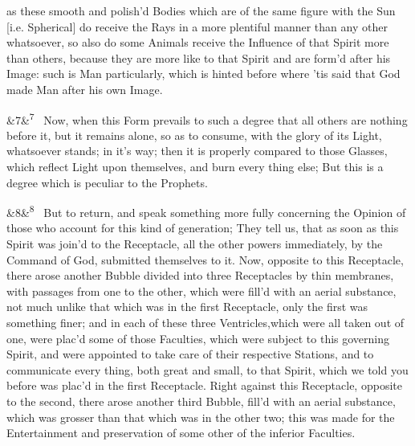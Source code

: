\documentclass[12pt]{article}
\newcommand{\para}[1][]{\par\noindent\ifx&#1&\else\textsuperscript{\footnotesize #1}~\fi}
\begin{document}
as these smooth and polish'd Bodies which are of the same figure with the Sun [i.e. Spherical] do receive the Rays in a more plentiful manner than any other whatsoever, so also do some Animals receive the Influence of that Spirit more than others, because they are more like to that Spirit and are form'd after his Image: such is Man particularly, which is hinted before where 'tis said that God made Man after his own Image.

\para[7] Now, when this Form prevails to such a degree that all others are nothing before it, but it remains alone, so as to consume, with the glory of its Light, whatsoever stands; in it's way; then it is properly compared to those Glasses, which reflect Light upon themselves, and burn every thing else; But this is a degree which is peculiar to the Prophets.

\para[8] But to return, and speak something more fully concerning the Opinion of those who account for this kind of generation; They tell us, that as soon as this Spirit was join'd to the Receptacle, all the other powers immediately, by the Command of God, submitted themselves to it. Now, opposite to this Receptacle, there arose another Bubble divided into three Receptacles by thin membranes, with passages from one to the other, which were fill'd with an aerial substance, not much unlike that which was in the first Receptacle, only the first was something finer; and in each of these three Ventricles,which were all taken out of one, were plac'd some of those Faculties, which were subject to this governing Spirit, and were appointed to take care of their respective Stations, and to communicate every thing, both great and small, to that Spirit, which we told you before was plac'd in the first Receptacle. Right against this Receptacle, opposite to the second, there arose another third Bubble, fill'd with an aerial substance, which was grosser than that which was in the other two; this was made for the Entertainment and preservation of some other of the inferior Faculties.
\end{document}
